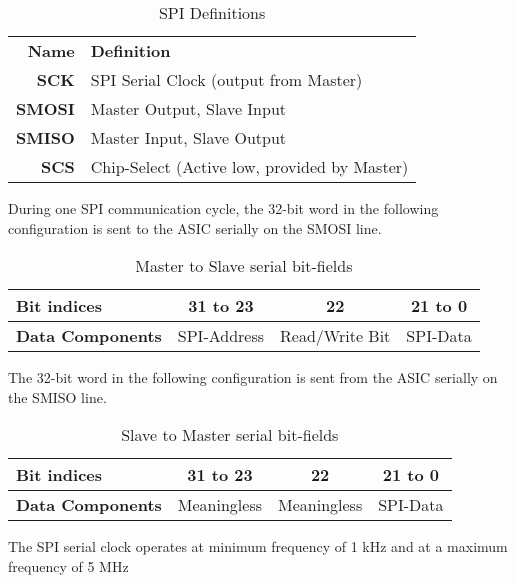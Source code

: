 \begin{table}[H]

    \label{tab:1}
    
  \begin{center}  
  \begin{tabular}{|r|l|}
  \hline
  \textbf{Name}  & \textbf{Definition} \\ \cline{1-2}
  
  \textbf{SCK} & SPI Serial Clock (output from Master) \\
  \textbf{SMOSI} &Master Output, Slave Input \\ 
  \textbf{SMISO} &Master Input, Slave Output\\
  \textbf{SCS} &Chip-Select (Active low, provided by Master)\\
  \hline
  
\end{tabular}
\end{center}
\caption[]{SPI Definitions}
\end{table}


During one SPI communication cycle, the 32-bit word in the following configuration is sent to the ASIC serially on the SMOSI line.

\begin{table}[H]

    \label{tab:2}
    
  \begin{center}  
  \begin{tabular}{|l|c|c|c|}
  \hline
  \textbf{Bit indices}  & 31 to 23  & 22 & 21 to 0\\ 
  \hline
  \textbf{Data Components} & SPI-Address & Read/Write Bit & SPI-Data \\
  \hline
  
\end{tabular}
\end{center}
\caption[]{Master to Slave serial bit-fields}
\end{table}

The 32-bit word in the following configuration is sent from the ASIC serially on the SMISO line.

\begin{table}[H]


    \label{tab:3}
    
  \begin{center}  
  \begin{tabular}{|l|c|c|c|}
  \hline
  \textbf{Bit indices}  & 31 to 23  & 22 & 21 to 0\\ 
  \hline
  \textbf{Data Components} & Meaningless & Meaningless & SPI-Data \\
  \hline
  
\end{tabular}
\end{center}
\caption[]{Slave to Master serial bit-fields}
\end{table}
The SPI serial clock operates at minimum frequency of 1 kHz and at a maximum frequency of 5 MHz

